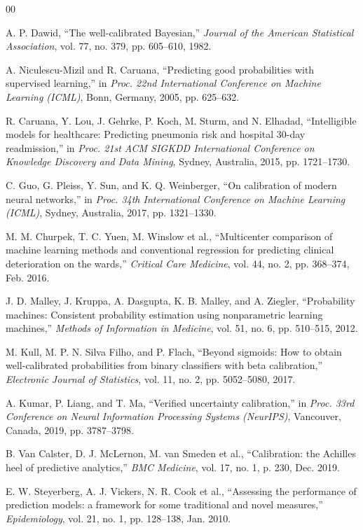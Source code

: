 \documentclass{ieeeaccess}
\begin{document}
\begin{thebibliography}{00}

 A. P. Dawid, ``The well-calibrated Bayesian,'' \emph{Journal of the American Statistical Association}, vol. 77, no. 379, pp. 605--610, 1982.

 A. Niculescu-Mizil and R. Caruana, ``Predicting good probabilities with supervised learning,'' in \emph{Proc. 22nd International Conference on Machine Learning (ICML)}, Bonn, Germany, 2005, pp. 625--632.

 R. Caruana, Y. Lou, J. Gehrke, P. Koch, M. Sturm, and N. Elhadad, ``Intelligible models for healthcare: Predicting pneumonia risk and hospital 30-day readmission,'' in \emph{Proc. 21st ACM SIGKDD International Conference on Knowledge Discovery and Data Mining}, Sydney, Australia, 2015, pp. 1721--1730.

 C. Guo, G. Pleiss, Y. Sun, and K. Q. Weinberger, ``On calibration of modern neural networks,'' in \emph{Proc. 34th International Conference on Machine Learning (ICML)}, Sydney, Australia, 2017, pp. 1321--1330.

 M. M. Churpek, T. C. Yuen, M. Winslow et al., ``Multicenter comparison of machine learning methods and conventional regression for predicting clinical deterioration on the wards,'' \emph{Critical Care Medicine}, vol. 44, no. 2, pp. 368--374, Feb. 2016.

 J. D. Malley, J. Kruppa, A. Dasgupta, K. B. Malley, and A. Ziegler, ``Probability machines: Consistent probability estimation using nonparametric learning machines,'' \emph{Methods of Information in Medicine}, vol. 51, no. 6, pp. 510--515, 2012.

 M. Kull, M. P. N. Silva Filho, and P. Flach, ``Beyond sigmoids: How to obtain well-calibrated probabilities from binary classifiers with beta calibration,'' \emph{Electronic Journal of Statistics}, vol. 11, no. 2, pp. 5052--5080, 2017.

 A. Kumar, P. Liang, and T. Ma, ``Verified uncertainty calibration,'' in \emph{Proc. 33rd Conference on Neural Information Processing Systems (NeurIPS)}, Vancouver, Canada, 2019, pp. 3787--3798.

 B. Van Calster, D. J. McLernon, M. van Smeden et al., ``Calibration: the Achilles heel of predictive analytics,'' \emph{BMC Medicine}, vol. 17, no. 1, p. 230, Dec. 2019.

 E. W. Steyerberg, A. J. Vickers, N. R. Cook et al., ``Assessing the performance of prediction models: a framework for some traditional and novel measures,'' \emph{Epidemiology}, vol. 21, no. 1, pp. 128--138, Jan. 2010.



\end{thebibliography}
\end{document}
